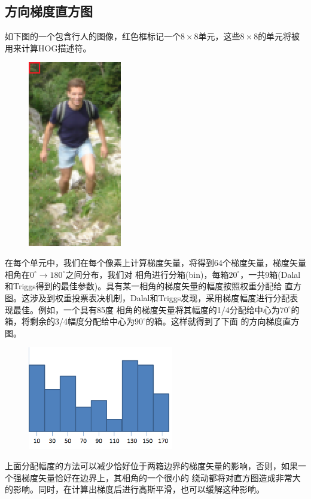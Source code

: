 \documentclass[10pt,technote,onecolumn,twoside]{IEEEtran}
\begin{document}
\subsection{方向梯度直方图}
如下图的一个包含行人的图像，红色框标记一个$8\times8$单元，这些$8\times8$的单元将被用来计算HOG描述符。
\begin{figure}[!h]
\centering
\includegraphics[width=1.6in]{hog-1.png}
\end{figure}
在每个单元中，我们在每个像素上计算梯度矢量，将得到64个梯度矢量，梯度矢量相角在$0^\circ\to180^\circ$之间分布，我们对
相角进行分箱(bin)，每箱$20^\circ$，一共9箱(Dalal和Triggs得到的最佳参数)。具有某一相角的梯度矢量的幅度按照权重分配给
直方图。这涉及到权重投票表决机制，Dalal和Triggs发现，采用梯度幅度进行分配表现最佳。例如，一个具有85度
相角的梯度矢量将其幅度的1/4分配给中心为$70^\circ$的箱，将剩余的3/4幅度分配给中心为$90^\circ$的箱。这样就得到了下面
的方向梯度直方图。
\begin{figure}[htbp]
\centering
\includegraphics[width=2.5in]{hog-2.png}
\end{figure}

上面分配幅度的方法可以减少恰好位于两箱边界的梯度矢量的影响，否则，如果一个强梯度矢量恰好在边界上，其相角的一个很小的
绕动都将对直方图造成非常大的影响。同时，在计算出梯度后进行高斯平滑，也可以缓解这种影响。
\end{document}
